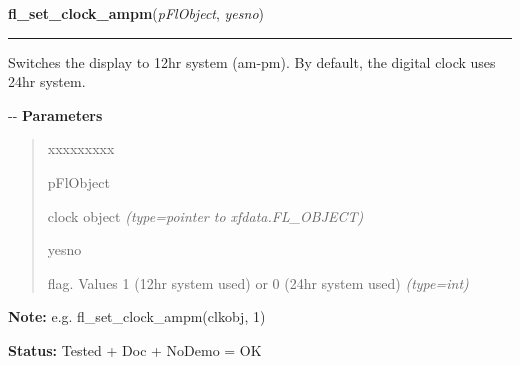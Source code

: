     \vspace{0.5ex}

\hspace{.8\funcindent}\begin{boxedminipage}{\funcwidth}

    \raggedright \textbf{fl\_set\_clock\_ampm}(\textit{pFlObject}, \textit{yesno})

    \vspace{-1.5ex}

    \rule{\textwidth}{0.5\fboxrule}
\setlength{\parskip}{2ex}

Switches the display to 12hr system (am-pm). By default, the
digital clock uses 24hr system.

-{}-
\setlength{\parskip}{1ex}
      \textbf{Parameters}
      \vspace{-1ex}

      \begin{quote}
        \begin{Ventry}{xxxxxxxxx}

          \item[pFlObject]


clock object
            {\it (type=pointer to xfdata.FL\_OBJECT)}

          \item[yesno]


flag. Values 1 (12hr system used) or 0 (24hr system used)
            {\it (type=int)}

        \end{Ventry}

      \end{quote}

\textbf{Note:} 
e.g. fl\_set\_clock\_ampm(clkobj, 1)


\textbf{Status:} 
Tested + Doc + NoDemo = OK


    \end{boxedminipage}

